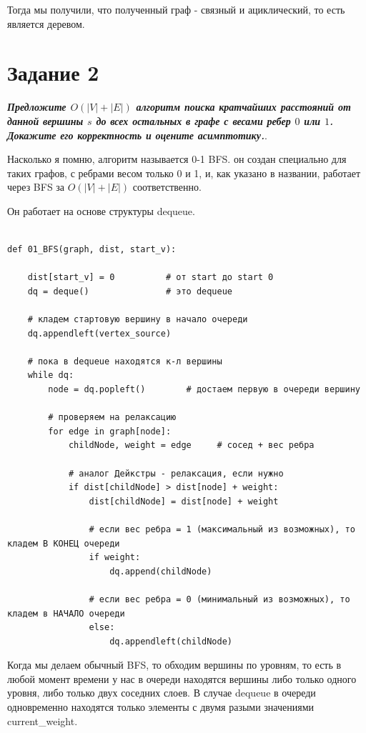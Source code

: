 \documentclass{article}
\begin{document}
Тогда мы получили, что полученный граф - связный и ациклический, то есть является деревом.

\bigskip

\section*{\textbf{Задание 2}} \textbf{\textit{Предложите $O(|V | + |E|)$ алгоритм поиска кратчайших расстояний от данной вершины $s$ до всех остальных в графе с весами ребер $0$ или $1$. Докажите его корректность и оцените асимптотику.}}.

Насколько я помню, алгоритм называется 0-1 BFS. он создан специально для таких графов, с ребрами весом только 0 и 1, и, как указано в названии, работает через BFS за $O(|V| + |E|)$ соответственно.

Он работает на основе структуры dequeue.

\begin{verbatim}

def 01_BFS(graph, dist, start_v):
    
    dist[start_v] = 0          # от start до start 0
    dq = deque()               # это dequeue

    # кладем стартовую вершину в начало очереди
    dq.appendleft(vertex_source)

    # пока в dequeue находятся к-л вершины
    while dq:
        node = dq.popleft()        # достаем первую в очереди вершину
      
        # проверяем на релаксацию
        for edge in graph[node]:
            childNode, weight = edge     # сосед + вес ребра
          
            # аналог Дейкстры - релаксация, если нужно
            if dist[childNode] > dist[node] + weight:
                dist[childNode] = dist[node] + weight
              
                # если вес ребра = 1 (максимальный из возможных), то кладем В КОНЕЦ очереди
                if weight:
                    dq.append(childNode)
              
                # если вес ребра = 0 (минимальный из возможных), то кладем в НАЧАЛО очереди
                else:
                    dq.appendleft(childNode)
\end{verbatim}

Когда мы делаем обычный BFS, то обходим вершины по уровням, то есть в любой момент времени у нас в очереди находятся вершины либо только одного уровня, либо только двух соседних слоев. В случае dequeue в очереди одновременно находятся только элементы с двумя разыми значениями current\_weight.
\end{document}
